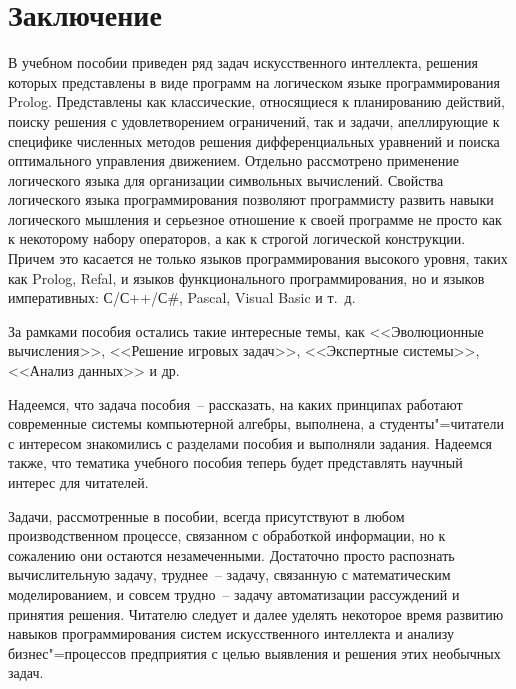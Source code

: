 \documentclass[a4paper,14pt, openany, twoside, final]{extbook} %
\begin{document}


\chapter*{Заключение}

В учебном пособии приведен ряд задач искусственного интеллекта, решения которых представлены в виде программ на логическом языке программирования Prolog.  Представлены как классические, относящиеся к планированию действий, поиску решения с удовлетворением ограничений, так и задачи, апеллирующие к специфике численных методов решения дифференциальных уравнений и поиска оптимального управления движением.  Отдельно рассмотрено применение логического языка для организации символьных вычислений.  Свойства логического языка программирования позволяют программисту развить навыки логического мышления и серьезное отношение к своей программе не просто как к некоторому набору операторов, а как к строгой логической конструкции.  Причем это касается не только языков программирования высокого уровня, таких как Prolog, Refal, и языков функционального программирования, но и языков императивных: С/С++/С\#, Pascal, Visual Basic и т.~д.

За рамками пособия остались такие интересные темы, как <<Эволюционные вычисления>>, <<Решение игровых задач>>, <<Экспертные системы>>, <<Анализ данных>> и др.

Надеемся, что задача пособия~-- рассказать, на каких принципах работают современные системы компьютерной алгебры, выполнена, а студенты"=читатели с интересом знакомились с разделами пособия и выполняли задания.  Надеемся также, что тематика учебного пособия теперь будет представлять научный интерес для читателей.

Задачи, рассмотренные в пособии, всегда присутствуют в любом производственном процессе, связанном с обработкой информации, но к сожалению они остаются незамеченными.  Достаточно просто распознать вычислительную задачу, труднее~-- задачу, связанную с математическим моделированием, и совсем трудно~-- задачу автоматизации рассуждений и принятия решения.  Читателю следует и далее уделять некоторое время развитию навыков программирования систем искусственного интеллекта и анализу бизнес"=процессов предприятия с целью выявления и решения этих необычных задач.
\end{document}
